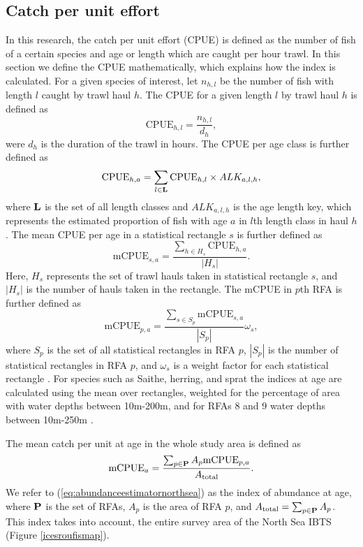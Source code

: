\documentclass[a4paper 12pt]{article}
\numberwithin{equation}{section}
\begin{document}
\subsection{Catch per unit effort}
\label{sec:cpueestimators}
In this research, the catch per unit effort (CPUE) is defined as the number of fish of a certain species and age or length which are caught per hour trawl. In this section we define the CPUE mathematically, which explains how the index is calculated. For a given species of interest, let $n_{h,l}$ be the number of fish with length $l$ caught by trawl haul $h$. The CPUE for a given length $l$ by trawl haul $h$ is defined as 
\begin{equation}\label{eq:cpueHaul}
\mathrm{CPUE}_{h,l} =\frac{n_{h,l}}{d_h},
\end{equation}
were $d_h$ is the duration of the trawl in hours. The CPUE per age class is further defined as
\begin{equation}\label{eq:cpueALK}
\mathrm{CPUE}_{h,a} =\sum_{l \in {\bf L}}\mathrm{CPUE}_{h, l} \times ALK_{a,l,h},
\end{equation}
where ${\bf L}$ is the set of all length classes and $ALK_{a,l,h}$ is the age length key, which represents the estimated proportion of fish with age $a$ in $l$th length class in haul $h$. The mean CPUE per age in a statistical rectangle $s$ is further defined as
\begin{equation}\label{eq:cpueRec}
\mathrm{mCPUE}_{s,a} =\frac{\sum_{h \in H_{s}} \mathrm{CPUE}_{h,a}}{|H_{s}|}.
\end{equation}
Here, $H_{s}$ represents the set of trawl hauls taken in statistical rectangle $s$, and $|H_{s}|$ is the number of hauls taken in the rectangle. The mCPUE in $p$th RFA is further defined as
\begin{equation}\label{eq:cpueRFA}
\mathrm{mCPUE}_{p,a} = \frac{ \sum_{s \in S_{p}} \mathrm{mCPUE}_{s,a}}{|S_{p}|} \omega_s,
\end{equation}
where $S_{p}$ is the set of all statistical rectangles in RFA $p$, $|S_{p}|$ is the number of statistical rectangles in RFA $p$, and $\omega_s$ is a weight factor for each statistical rectangle \citep{ICES2013}. For species such as Saithe, herring, and sprat the indices at age are calculated using the mean over rectangles, weighted for the percentage of area with water depths between 10m-200m, and for RFAs 8 and 9 water depths between 10m-250m \citep{ICES2013}.

 The mean catch per unit at age in the whole study area is defined as
\begin{equation}
\text{mCPUE}_a= \frac{\sum_{p\in {\bf P}} A_{p}  \mathrm{mCPUE}_{p,a}}{A_{\text{total}}}.
\label{eq:abundanceestimatornorthsea}
\end{equation}
We refer to (\ref{eq:abundanceestimatornorthsea}) as the index of abundance at age, where ${\bf P}$ is the set of RFAs, $A_p$ is the area of RFA $p$, and $A_{\text{total}} = \sum_{p\in {\bf P}} A_{p}$. This index takes into account, the entire survey area of the North Sea IBTS (Figure \ref{icesroufismap}). 
\end{document}
